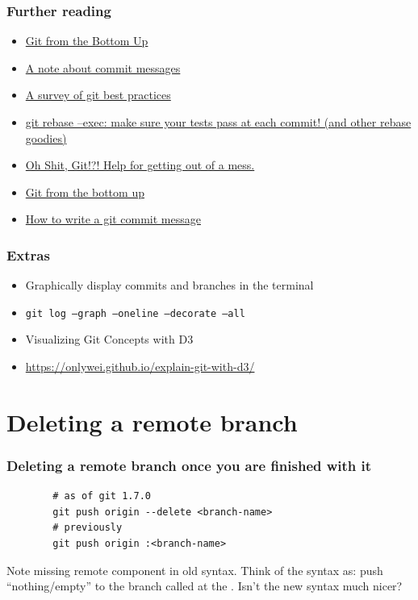 \documentclass{git_course}
\begin{document}
\begin{frame}
\frametitle{Further reading}
\begin{itemize}
    \item \href{http://jwiegley.github.io/git-from-the-bottom-up/}{Git from the Bottom Up}
    \item \href{http://tbaggery.com/2008/04/19/a-note-about-git-commit-messages.html}
               {A note about commit messages}
    \item \href{https://xdg.me/blog/a-survey-of-git-best-practices/}
               {A survey of git best practices}
    \item \href{http://kamalmarhubi.com/blog/2016/03/08/git-rebase-exec-make-sure-your-tests-pass-at-each-commit-and-other-rebase-goodies/}
               {git rebase --exec: make sure your tests pass at each commit!  (and other rebase goodies)}
    \item \href{https://ohshitgit.com/}{Oh Shit, Git!?!  Help for getting out of a mess.}
    \item \href{https://jwiegley.github.io/git-from-the-bottom-up/}{Git from the bottom up}
    \item \href{https://cbea.ms/git-commit/}{How to write a git commit message}
\end{itemize}
\end{frame}

\begin{frame}
    \frametitle{Extras}
    \begin{itemize}
        \item Graphically display commits and branches in the terminal
        \item \texttt{git log --graph --oneline --decorate --all}
        \item Visualizing Git Concepts with D3
        \item \url{https://onlywei.github.io/explain-git-with-d3/}
    \end{itemize}
\end{frame}

\section{Deleting a remote branch}

\begin{frame}[fragile]
    \frametitle{Deleting a remote branch once you are finished with it}

    \begin{verbatim}
        # as of git 1.7.0
        git push origin --delete <branch-name>
        # previously
        git push origin :<branch-name>
    \end{verbatim}

    Note missing remote component in old syntax.  Think of the syntax as:
    push ``nothing/empty'' to the branch called  at the
    .  Isn't the new syntax much nicer?
\end{frame}
\end{document}
